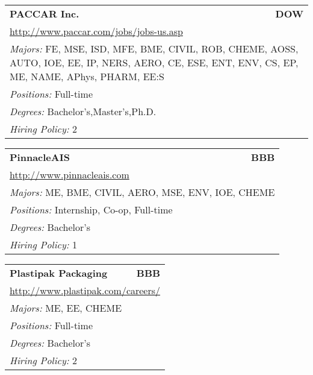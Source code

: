 \documentclass[twoside]{article}
\begin{document}
\begin{center}
\begin{multicols}{3}
\begin{FlushLeft}
\begin{minipage}{.9\columnwidth}
\end{minipage}
 
\begin{minipage}{.9\columnwidth}\begin{tabularx}{.95\columnwidth}{Xr}
                 {\Large\bf PACCAR Inc.} & {\Large\bf DOW}\\
    \multicolumn{2}{p{.95\columnwidth}}{\url{http://www.paccar.com/jobs/jobs-us.asp}}\\
    \multicolumn{2}{p{.95\columnwidth}}{\emph{Majors:} FE, MSE, ISD, MFE, BME, CIVIL, ROB, CHEME, AOSS, AUTO, IOE, EE, IP, NERS, AERO, CE, ESE, ENT, ENV, CS, EP, ME, NAME, APhys, PHARM, EE:S}\\
    \multicolumn{2}{p{.95\columnwidth}}{\emph{Positions:} Full-time}\\
    \multicolumn{2}{p{.95\columnwidth}}{\emph{Degrees:} Bachelor's,Master's,Ph.D.}\\
    \multicolumn{2}{p{.95\columnwidth}}{\emph{Hiring Policy:} 2}\\
    \end{tabularx}
    
\end{minipage}
 
\begin{minipage}{.9\columnwidth}\begin{tabularx}{.95\columnwidth}{Xr}
                 {\Large\bf PinnacleAIS} & {\Large\bf BBB}\\
    \multicolumn{2}{p{.95\columnwidth}}{\url{http://www.pinnacleais.com}}\\
    \multicolumn{2}{p{.95\columnwidth}}{\emph{Majors:} ME, BME, CIVIL, AERO, MSE, ENV, IOE, CHEME}\\
    \multicolumn{2}{p{.95\columnwidth}}{\emph{Positions:} Internship, Co-op, Full-time}\\
    \multicolumn{2}{p{.95\columnwidth}}{\emph{Degrees:} Bachelor's}\\
    \multicolumn{2}{p{.95\columnwidth}}{\emph{Hiring Policy:} 1}\\
    \end{tabularx}
    
\end{minipage}
 
\begin{minipage}{.9\columnwidth}\begin{tabularx}{.95\columnwidth}{Xr}
                 {\Large\bf Plastipak Packaging} & {\Large\bf BBB}\\
    \multicolumn{2}{p{.95\columnwidth}}{\url{http://www.plastipak.com/careers/}}\\
    \multicolumn{2}{p{.95\columnwidth}}{\emph{Majors:} ME, EE, CHEME}\\
    \multicolumn{2}{p{.95\columnwidth}}{\emph{Positions:} Full-time}\\
    \multicolumn{2}{p{.95\columnwidth}}{\emph{Degrees:} Bachelor's}\\
    \multicolumn{2}{p{.95\columnwidth}}{\emph{Hiring Policy:} 2}\\
    \end{tabularx}
    

\end{minipage}
\end{FlushLeft}
\end{multicols}
\end{center}
\end{document}
